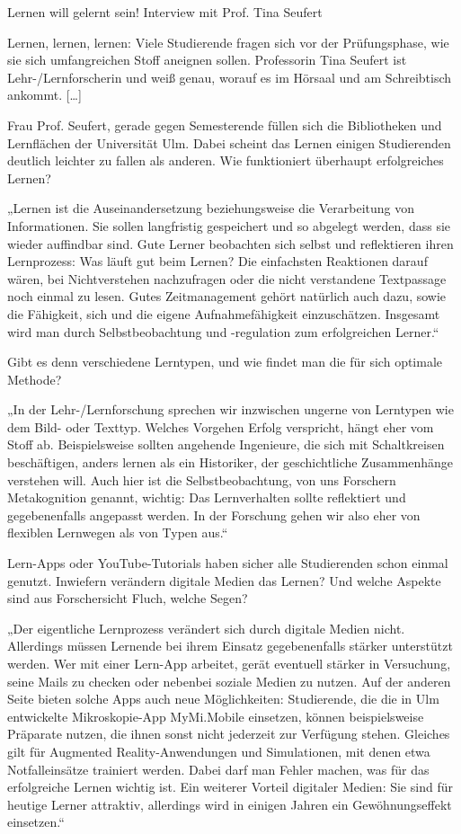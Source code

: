 Lernen will gelernt sein! Interview mit Prof. Tina Seufert

Lernen, lernen, lernen: Viele Studierende fragen sich vor der Prüfungsphase, wie sie sich umfangreichen Stoff aneignen sollen. Professorin Tina Seufert ist Lehr-/Lernforscherin und weiß genau, worauf es im Hörsaal und am Schreibtisch ankommt. [\ldots]

Frau Prof. Seufert, gerade gegen Semesterende füllen sich die Bibliotheken und Lernflächen der Universität Ulm. Dabei scheint das Lernen einigen Studierenden deutlich leichter zu fallen als anderen. Wie funktioniert überhaupt erfolgreiches Lernen?

„Lernen ist die Auseinandersetzung beziehungsweise die Verarbeitung von Informationen. Sie sollen langfristig gespeichert und so abgelegt werden, dass sie wieder auffindbar sind. Gute Lerner beobachten sich selbst und reflektieren ihren Lernprozess: Was läuft gut beim Lernen? Die einfachsten Reaktionen darauf wären, bei Nichtverstehen nachzufragen oder die nicht verstandene Textpassage noch einmal zu lesen. Gutes Zeitmanagement gehört natürlich auch dazu, sowie die Fähigkeit, sich und die eigene Aufnahmefähigkeit einzuschätzen. Insgesamt wird man durch Selbstbeobachtung und -regulation zum erfolgreichen Lerner.“

Gibt es denn verschiedene Lerntypen, und wie findet man die für sich optimale Methode?

„In der Lehr-/Lernforschung sprechen wir inzwischen ungerne von Lerntypen wie dem Bild- oder Texttyp. Welches Vorgehen Erfolg verspricht, hängt eher vom Stoff ab. Beispielsweise sollten angehende Ingenieure, die sich mit Schaltkreisen beschäftigen, anders lernen als ein Historiker, der geschichtliche Zusammenhänge verstehen will. Auch hier ist die Selbstbeobachtung, von uns Forschern Metakognition genannt, wichtig: Das Lernverhalten sollte reflektiert und gegebenenfalls angepasst werden. In der Forschung gehen wir also eher von flexiblen Lernwegen als von Typen aus.“

Lern-Apps oder YouTube-Tutorials haben sicher alle Studierenden schon einmal genutzt. Inwiefern verändern digitale Medien das Lernen? Und welche Aspekte sind aus Forschersicht Fluch, welche Segen?

„Der eigentliche Lernprozess verändert sich durch digitale Medien nicht. Allerdings müssen Lernende bei ihrem Einsatz gegebenenfalls stärker unterstützt werden. Wer mit einer Lern-App arbeitet, gerät eventuell stärker in Versuchung, seine Mails zu checken oder nebenbei soziale Medien zu nutzen. Auf der anderen Seite bieten solche Apps auch neue Möglichkeiten: Studierende, die die in Ulm entwickelte Mikroskopie-App MyMi.Mobile einsetzen, können beispielsweise Präparate nutzen, die ihnen sonst nicht jederzeit zur Verfügung stehen. Gleiches gilt für Augmented Reality-Anwendungen und Simulationen, mit denen etwa Notfalleinsätze trainiert werden. Dabei darf man Fehler machen, was für das erfolgreiche Lernen wichtig ist. Ein weiterer Vorteil digitaler Medien: Sie sind für heutige Lerner attraktiv, allerdings wird in einigen Jahren ein Gewöhnungseffekt einsetzen.“


